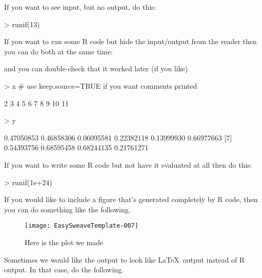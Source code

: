 \documentclass[12pt]{article}         %
\begin{document}
If you want to see input, but no output, do this:

\begin{Schunk}
\begin{Sinput}
> runif(13)
\end{Sinput}
\end{Schunk}

If you want to run some \textsf{R} code but hide the input/output from the reader then you can do both at the same time:


\bigskip   %

and you can double-check that it worked later (if you like)

\begin{Schunk}
\begin{Sinput}
> x  # use keep.source=TRUE if you want comments printed
\end{Sinput}
\begin{Soutput}
 [1]  2  3  4  5  6  7  8  9 10 11
\end{Soutput}
\begin{Sinput}
> y
\end{Sinput}
\begin{Soutput}
 [1] 0.47050853 0.46858306 0.06095581 0.22382118 0.13999930 0.66977663
 [7] 0.54393756 0.68595458 0.68244135 0.21761271
\end{Soutput}
\end{Schunk}

If you want to write some \textsf{R} code but not have it evaluated at all then do this:

\begin{Schunk}
\begin{Sinput}
> runif(1e+24)
\end{Sinput}
\end{Schunk}

If you would like to include a figure that's generated completely by \textsf{R} code, then you can do something like the following.

\begin{figure}
\texttt{[image: EasySweaveTemplate-007]}
\caption{Here is the plot we made}
\end{figure}


Sometimes we would like the output to look like \LaTeX\ output instead of \textsf{R} output.  In that case, do the following.
\end{document}
